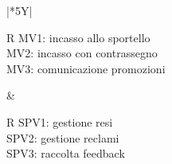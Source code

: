 \documentclass[a4paper,12pt]{article}
\begin{document}
\begin{center}
\begin{tabularx}{\textwidth}{|*{5}{Y|}}
	\begin{tabular}{R}
		\hline
		MV1: incasso allo sportello   \\ \hline
		MV2: incasso con contrassegno \\ \hline
		MV3: comunicazione promozioni \\ \hline
	\end{tabular} &

	\begin{tabular}{R}
		\hline
		SPV1: gestione resi     \\ \hline
		SPV2: gestione reclami  \\ \hline
		SPV3: raccolta feedback \\ \hline
	\end{tabular}                                                                                                                                                                    \\
	\hline


\end{tabularx}
\end{center}
\end{document}
